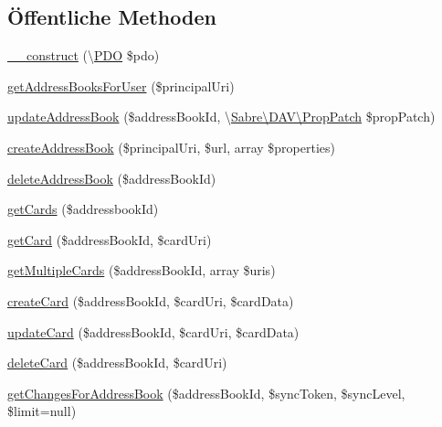 \subsection*{Öffentliche Methoden}
\begin{DoxyCompactItemize}
\item 
\mbox{\hyperlink{class_sabre_1_1_card_d_a_v_1_1_backend_1_1_p_d_o_ae66e92f8fd4672c81afbcb1a32c46154}{\+\_\+\+\_\+construct}} (\textbackslash{}\mbox{\hyperlink{class_sabre_1_1_card_d_a_v_1_1_backend_1_1_p_d_o}{P\+DO}} \$pdo)
\item 
\mbox{\hyperlink{class_sabre_1_1_card_d_a_v_1_1_backend_1_1_p_d_o_ab7e926f24a4120ec0acc3b5315c555be}{get\+Address\+Books\+For\+User}} (\$principal\+Uri)
\item 
\mbox{\hyperlink{class_sabre_1_1_card_d_a_v_1_1_backend_1_1_p_d_o_a570d00636a96b320a21c6c52fdaf2c16}{update\+Address\+Book}} (\$address\+Book\+Id, \textbackslash{}\mbox{\hyperlink{class_sabre_1_1_d_a_v_1_1_prop_patch}{Sabre\textbackslash{}\+D\+A\+V\textbackslash{}\+Prop\+Patch}} \$prop\+Patch)
\item 
\mbox{\hyperlink{class_sabre_1_1_card_d_a_v_1_1_backend_1_1_p_d_o_a8c739255019e1925ac97bcb09bd4e7ed}{create\+Address\+Book}} (\$principal\+Uri, \$url, array \$properties)
\item 
\mbox{\hyperlink{class_sabre_1_1_card_d_a_v_1_1_backend_1_1_p_d_o_aac696010f7d615154ad82c7b3e209d9c}{delete\+Address\+Book}} (\$address\+Book\+Id)
\item 
\mbox{\hyperlink{class_sabre_1_1_card_d_a_v_1_1_backend_1_1_p_d_o_a39891db02d86c2242de352c83f839ece}{get\+Cards}} (\$addressbook\+Id)
\item 
\mbox{\hyperlink{class_sabre_1_1_card_d_a_v_1_1_backend_1_1_p_d_o_a8ce1c064d4f5842c62cab2320033135e}{get\+Card}} (\$address\+Book\+Id, \$card\+Uri)
\item 
\mbox{\hyperlink{class_sabre_1_1_card_d_a_v_1_1_backend_1_1_p_d_o_a14ec8708e8c2a04e7b0d23fc526b23dd}{get\+Multiple\+Cards}} (\$address\+Book\+Id, array \$uris)
\item 
\mbox{\hyperlink{class_sabre_1_1_card_d_a_v_1_1_backend_1_1_p_d_o_aebebc1ae25c4d4eee6224bad6111c5c3}{create\+Card}} (\$address\+Book\+Id, \$card\+Uri, \$card\+Data)
\item 
\mbox{\hyperlink{class_sabre_1_1_card_d_a_v_1_1_backend_1_1_p_d_o_af9221a622af0f1584732f5ed661bdd19}{update\+Card}} (\$address\+Book\+Id, \$card\+Uri, \$card\+Data)
\item 
\mbox{\hyperlink{class_sabre_1_1_card_d_a_v_1_1_backend_1_1_p_d_o_adcf44f8f25f73d511a8f9287957b2e62}{delete\+Card}} (\$address\+Book\+Id, \$card\+Uri)
\item 
\mbox{\hyperlink{class_sabre_1_1_card_d_a_v_1_1_backend_1_1_p_d_o_a6a70f8be9de0b90321638e8d57a9ab65}{get\+Changes\+For\+Address\+Book}} (\$address\+Book\+Id, \$sync\+Token, \$sync\+Level, \$limit=null)
\end{DoxyCompactItemize}
